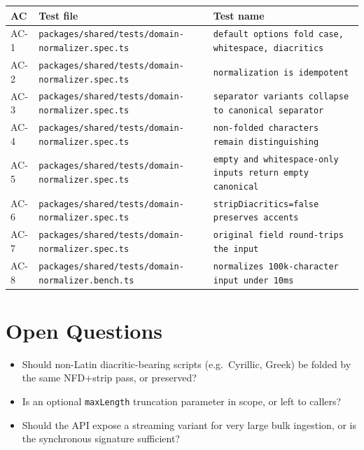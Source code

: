 \begin{center}
\begin{tabular}{@{}lll@{}}
\toprule
AC & Test file & Test name \\
\midrule
AC-1 & \texttt{packages/shared/tests/domain-normalizer.spec.ts} & \texttt{default options fold case, whitespace, diacritics} \\
AC-2 & \texttt{packages/shared/tests/domain-normalizer.spec.ts} & \texttt{normalization is idempotent} \\
AC-3 & \texttt{packages/shared/tests/domain-normalizer.spec.ts} & \texttt{separator variants collapse to canonical separator} \\
AC-4 & \texttt{packages/shared/tests/domain-normalizer.spec.ts} & \texttt{non-folded characters remain distinguishing} \\
AC-5 & \texttt{packages/shared/tests/domain-normalizer.spec.ts} & \texttt{empty and whitespace-only inputs return empty canonical} \\
AC-6 & \texttt{packages/shared/tests/domain-normalizer.spec.ts} & \texttt{stripDiacritics=false preserves accents} \\
AC-7 & \texttt{packages/shared/tests/domain-normalizer.spec.ts} & \texttt{original field round-trips the input} \\
AC-8 & \texttt{packages/shared/tests/domain-normalizer.bench.ts} & \texttt{normalizes 100k-character input under 10ms} \\
\bottomrule
\end{tabular}
\end{center}

\section{Open Questions}
\begin{itemize}[leftmargin=1.2em]
  \item Should non-Latin diacritic-bearing scripts (e.g.\ Cyrillic, Greek) be folded by the same NFD+strip pass, or preserved?
  \item Is an optional \texttt{maxLength} truncation parameter in scope, or left to callers?
  \item Should the API expose a streaming variant for very large bulk ingestion, or is the synchronous signature sufficient?
\end{itemize}


